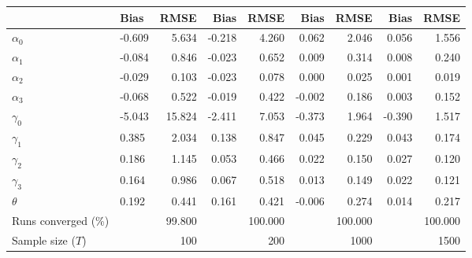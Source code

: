 
\begin{tabular}[t]{llrrrrrrr}
\toprule
  & Bias & RMSE & Bias & RMSE & Bias & RMSE & Bias & RMSE\\
\midrule
$\alpha_{0}$ & -0.609 & 5.634 & -0.218 & 4.260 & 0.062 & 2.046 & 0.056 & 1.556\\
$\alpha_{1}$ & -0.084 & 0.846 & -0.023 & 0.652 & 0.009 & 0.314 & 0.008 & 0.240\\
$\alpha_{2}$ & -0.029 & 0.103 & -0.023 & 0.078 & 0.000 & 0.025 & 0.001 & 0.019\\
$\alpha_{3}$ & -0.068 & 0.522 & -0.019 & 0.422 & -0.002 & 0.186 & 0.003 & 0.152\\
$\gamma_{0}$ & -5.043 & 15.824 & -2.411 & 7.053 & -0.373 & 1.964 & -0.390 & 1.517\\
$\gamma_{1}$ & 0.385 & 2.034 & 0.138 & 0.847 & 0.045 & 0.229 & 0.043 & 0.174\\
$\gamma_{2}$ & 0.186 & 1.145 & 0.053 & 0.466 & 0.022 & 0.150 & 0.027 & 0.120\\
$\gamma_{3}$ & 0.164 & 0.986 & 0.067 & 0.518 & 0.013 & 0.149 & 0.022 & 0.121\\
$\theta$ & 0.192 & 0.441 & 0.161 & 0.421 & -0.006 & 0.274 & 0.014 & 0.217\\
Runs converged (\%) &  & 99.800 &  & 100.000 &  & 100.000 &  & 100.000\\
Sample size ($T$) &  & 100 &  & 200 &  & 1000 &  & 1500\\
\bottomrule
\end{tabular}
